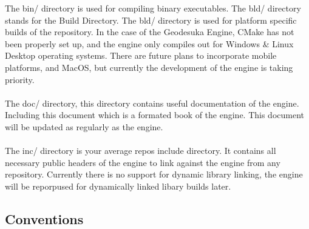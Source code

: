 \documentclass[a4paper,10pt]{book}
\begin{document}
The bin/ directory is used for compiling binary executables. 
The bld/ directory stands for the Build Directory. The bld/ directory is used for platform specific builds of the repository.
In the case of the Geodesuka Engine, CMake has not been properly set up, and the engine only compiles out for Windows \& Linux Desktop operating systems. There are future plans
to incorporate mobile platforms, and MacOS, but currently the development of the engine is taking priority. \\ \\ The doc/ directory, this directory contains useful documentation
of the engine. Including this document which is a formated book of the engine. This document will be updated as regularly as the engine. \\ \\ The inc/ directory is your average repos include directory.
It contains all necessary public headers of the engine to link against the engine from any repository. Currently there is no support for dynamic library linking, the engine will be reporpused for dynamically
linked libary builds later.
\subsection{Conventions}
\end{document}
